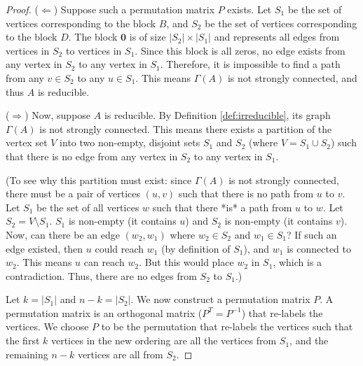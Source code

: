 \documentclass[12pt,a4paper]{report}
\theoremstyle{plain}
\theoremstyle{definition}
\theoremstyle{remark}
\begin{document}
\begin{proof}
($\Leftarrow$) Suppose such a permutation matrix $P$ exists. Let $S_1$ be the set of vertices corresponding to the block $B$, and $S_2$ be the set of vertices corresponding to the block $D$. The block $\mathbf{0}$ is of size $|S_2| \times |S_1|$ and represents all edges from vertices in $S_2$ to vertices in $S_1$. Since this block is all zeros, no edge exists from any vertex in $S_2$ to any vertex in $S_1$. Therefore, it is impossible to find a path from any $v \in S_2$ to any $u \in S_1$. This means $\Gamma(A)$ is not strongly connected, and thus $A$ is reducible.

($\Rightarrow$) Now, suppose $A$ is reducible. By Definition \ref{def:irreducible}, its graph $\Gamma(A)$ is not strongly connected. This means there exists a partition of the vertex set $V$ into two non-empty, disjoint sets $S_1$ and $S_2$ (where $V = S_1 \cup S_2$) such that there is no edge from any vertex in $S_2$ to any vertex in $S_1$.

(To see why this partition must exist: since $\Gamma(A)$ is not strongly connected, there must be a pair of vertices $(u, v)$ such that there is no path from $u$ to $v$. Let $S_1$ be the set of all vertices $w$ such that there *is* a path from $u$ to $w$. Let $S_2 = V \setminus S_1$. $S_1$ is non-empty (it contains $u$) and $S_2$ is non-empty (it contains $v$). Now, can there be an edge $(w_2, w_1)$ where $w_2 \in S_2$ and $w_1 \in S_1$? If such an edge existed, then $u$ could reach $w_1$ (by definition of $S_1$), and $w_1$ is connected to $w_2$. This means $u$ can reach $w_2$. But this would place $w_2$ in $S_1$, which is a contradiction. Thus, there are no edges from $S_2$ to $S_1$.)

Let $k = |S_1|$ and $n-k = |S_2|$. We now construct a permutation matrix $P$. A permutation matrix is an orthogonal matrix ($P^T = P^{-1}$) that re-labels the vertices. We choose $P$ to be the permutation that re-labels the vertices such that the first $k$ vertices in the new ordering are all the vertices from $S_1$, and the remaining $n-k$ vertices are all from $S_2$.


\end{proof}
\end{document}
